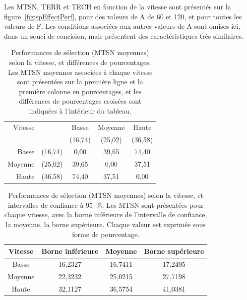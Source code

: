 	Les MTSN, TERR et TECH en fonction de la vitesse sont présentés sur la figure~\ref{fig:spEffectPerf}, pour des valeurs de A de 60 et 120, et pour toutes les valeurs de F. Les conditions associées aux autres valeurs de A sont omises ici, dans un souci de concision, mais présentent des caractéristiques très similaires.
	
	\begin{table}
		\centering
		\begin{tabular}{r c | c c c}
			Vitesse			&			& Basse		& Moyenne	& Haute		\\
							&			& (16,74)	& (25,02)	& (36,58)	\\ \hline
			Basse			& (16,74)	& 0,00		& 39,65		& 74,40		\bigstrut[t] \\
			Moyenne			& (25,02)	& 39,65		& 0,00		& 37,51		\\
			Haute			& (36,58)	& 74,40		& 37,51		& 0,00		\\
		\end{tabular}
		\caption[Performances selon la vitesse]{Performances de sélection (MTSN moyennes) selon la vitesse, et différences de pourcentages. Les MTSN moyennes associées à chaque vitesse sont présentées sur la première ligne et la première colonne en pourcentages, et les différences de pourcentages croisées sont indiquées à l'intérieur du tableau.}
		\label{tab:spPerf}
	\end{table}
	
	\begin{table}
		\centering
		\begin{tabular}{c | c c c}
			Vitesse		& Borne inférieure	& Moyenne	& Borne supérieure	\\ \hline
			Basse		& 16,2327			& 16,7411	& 17,2495			\bigstrut[t] \\
			Moyenne		& 22,3232			& 25,0215	& 27,7198			\\
			Haute		& 32,1127			& 36,5754	& 41,0381			\\
		\end{tabular}
		\caption[Performances selon la vitesse -- II]{Performances de sélection (MTSN moyennes) selon la vitesse, et intervalles de confiance à 95~\%{}. Les MTSN sont présentées pour chaque vitesse, avec la borne inférieure de l'intervalle de confiance, la moyenne, la borne supérieure. Chaque valeur est exprimée sous forme de pourcentage.}
		\label{tab:spPerfCIs}
	\end{table}	
	
